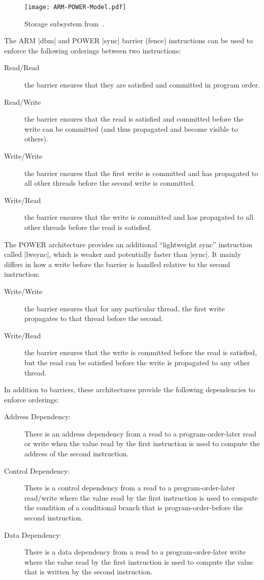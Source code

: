 \documentclass[a4paper,12pt,notitlepage,twoside,openright]{article}
\begin{document}
\begin{figure}[h]
	\centering
	\texttt{[image: ARM-POWER-Model.pdf]}
	\caption{Storage subsystem from~\cite{Maranget:2012}.}
	\label{fig:ARM-POWER-Model}
\end{figure}

The ARM |dbm| and POWER |sync| barrier (fence) instructions can be used to
enforce the following orderings between two instructions:
\begin{description}
	\item[Read/Read] the barrier ensures that they are satisfied
          and committed in program order.
	\item[Read/Write] the barrier ensures that the read is
          satisfied and committed before the write can be committed
          (and thus propagated and become visible to others).
	\item[Write/Write] the barrier ensures that the first write is
          committed and has propagated to all other threads before the
          second write is committed.
	\item[Write/Read] the barrier ensures that the write is
          committed and has propagated to all other threads before the
          read is satisfied.
\end{description}

The POWER architecture provides an additional ``lightweight sync''
instruction called |lwsync|, which is weaker and potentially faster
than |sync|. It mainly differs in how a write before the barrier is
handled relative to the second instruction:
\begin{description}
	\item[Write/Write] the barrier ensures that for any particular
          thread, the first write propagates to that thread before the
          second.
	\item[Write/Read] the barrier ensures that the write is
          committed before the read is satisfied, but the read can be
          satisfied before the write is propagated to any other
          thread.
\end{description}

In addition to barriers, these architectures provide the following
dependencies to enforce orderings:
\begin{description}
	\item[Address Dependency:] There is an address dependency from
          a read to a program-order-later read or write when the value
          read by the first instruction is used to compute the address
          of the second instruction.
	\item[Control Dependency:] There is a control dependency from a
          read to a program-order-later read/write where the value
          read by the first instruction is used to compute the
          condition of a conditional branch that is
          program-order-before the second instruction.
	\item[Data Dependency:] There is a data dependency from a read
          to a program-order-later write where the value read by the
          first instruction is used to compute the value that is
          written by the second instruction.
\end{description}
\end{document}
